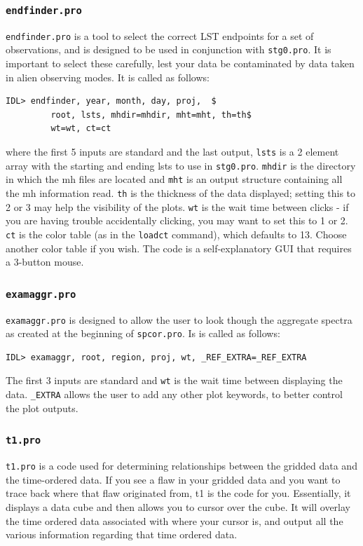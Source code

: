 \documentclass[11pt]{article}
\begin{document}
{\subsubsection{\texttt{endfinder.pro}}
\texttt{endfinder.pro} is a tool to select the correct LST endpoints for a set of observations, and is designed to be used in conjunction with \texttt{stg0.pro}. It is important to select these carefully, lest your data be contaminated by data taken in alien observing modes. It is called as follows:
\begin{verbatim}
IDL> endfinder, year, month, day, proj,  $
         root, lsts, mhdir=mhdir, mht=mht, th=th$
         wt=wt, ct=ct
\end{verbatim}
where the first 5 inputs are standard and the last output, \texttt{lsts} is a 2 element array with the starting and ending lsts to use in \texttt{stg0.pro}. \texttt{mhdir} is the directory in which the mh files are located and \texttt{mht} is an output structure containing all the mh information read. \texttt{th} is the thickness of the data displayed; setting this to 2 or 3 may help the visibility of the plots. \texttt{wt} is the wait time between clicks - if you are having trouble accidentally clicking, you may want to set this to 1 or 2. \texttt{ct} is the color table (as in the \texttt{loadct} command), which defaults to 13. Choose another color table if you wish. The code is a self-explanatory GUI that requires a 3-button mouse.

\subsubsection{\texttt{examaggr.pro}}
\texttt{examaggr.pro} is designed to allow the user to look though the aggregate spectra as created at the beginning of \texttt{spcor.pro}. Is is called as follows:
\begin{verbatim}
IDL> examaggr, root, region, proj, wt, _REF_EXTRA=_REF_EXTRA
\end{verbatim}
The first 3 inputs are standard and \texttt{wt} is the wait time between displaying the data. \texttt{\_EXTRA} allows the user to add any other plot keywords, to better control the plot outputs.

\subsubsection{\texttt{t1.pro}}
\texttt{t1.pro} is a code used for determining relationships between the gridded data and the time-ordered data. If you see a flaw in your gridded data and you want to trace back where that flaw originated from, t1 is the code for you. Essentially, it displays a data cube and then allows you to cursor over the cube. It will overlay the time ordered data associated with where your cursor is, and output all the various information regarding that time ordered data.

}
\end{document}
